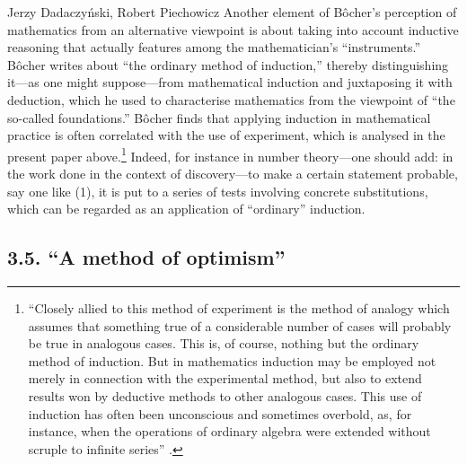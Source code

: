 \begin{artengenv}{Jerzy Dadaczyński, Robert Piechowicz}
Another element of Bôcher's perception of mathematics from an alternative viewpoint is about taking into account inductive reasoning that actually features among the mathematician's ``instruments.'' Bôcher writes about ``the ordinary method of induction,'' thereby distinguishing it---as one might suppose---from mathematical induction and juxtaposing it with deduction, which he used to characterise mathematics from the viewpoint of ``the so-called foundations.'' Bôcher finds that applying induction in mathematical practice is often correlated with the use of experiment, which is analysed in the present paper above.\footnote{``Closely allied to this method of experiment is the method of analogy which assumes that something true of a considerable number of cases will probably be true in analogous cases. This is, of course, nothing but the ordinary method of induction. But in mathematics induction may be employed not merely in connection with the experimental method, but also to extend results won by deductive methods to other analogous cases. This use of induction has often been unconscious and sometimes overbold, as, for instance, when the operations of ordinary algebra were extended without scruple to infinite series''
\parencite[][p.134]{bocher_fundamental_1904}.%
} Indeed, for instance in number theory---one should add: in the work done in the context of discovery---to make a certain statement probable, say one like (1), it is put to a series of tests involving concrete substitutions, which can be regarded as an application of ``ordinary'' induction.

\subsection{3.5. ``A method of optimism''}


\end{artengenv}
